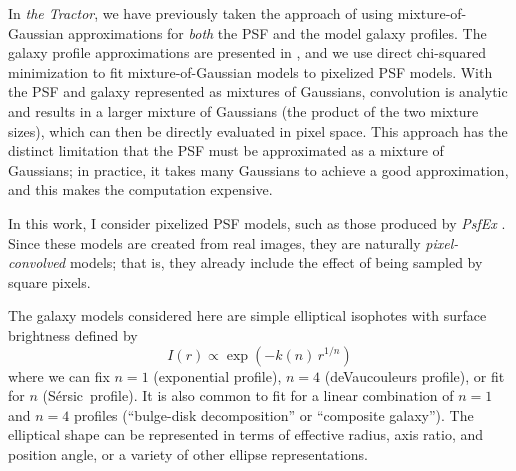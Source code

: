 \documentclass[11pt,preprint]{aastex}
\newcommand{\project}[1]{\textsl{#1}}
\newcommand{\sersic}{S\'ersic}
\begin{document}
In \project{the Tractor}, we have previously taken the approach of
using mixture-of-Gaussian approximations for \emph{both} the PSF and
the model galaxy profiles.  The galaxy profile approximations are
presented in \cite{moggalaxy}, and we use direct chi-squared
minimization to fit mixture-of-Gaussian models to pixelized PSF
models.  With the PSF and galaxy represented as mixtures of Gaussians,
convolution is analytic and results in a larger mixture of Gaussians
(the product of the two mixture sizes), which can then be directly
evaluated in pixel space.  This approach has the distinct limitation
that the PSF must be approximated as a mixture of Gaussians; in
practice, it takes many Gaussians to achieve a good approximation, and
this makes the computation expensive.

In this work, I consider pixelized PSF models, such as those produced
by \project{PsfEx} \citep{psfex}.  Since these models are created from
real images, they are naturally \emph{pixel-convolved} models; that
is, they already include the effect of being sampled by square pixels.

The galaxy models considered here are simple elliptical isophotes with
surface brightness defined by
\begin{equation}
  I(r) \propto \exp(- k(n) \, r^{1/n})
\end{equation}
where we can fix $n=1$ (exponential profile), $n=4$ (deVaucouleurs
profile), or fit for $n$ (\sersic\ profile).  It is also common to fit
for a linear combination of $n=1$ and $n=4$ profiles (``bulge-disk
decomposition'' or ``composite galaxy'').  The elliptical shape can be
represented in terms of effective radius, axis ratio, and position
angle, or a variety of other ellipse representations.
\end{document}
